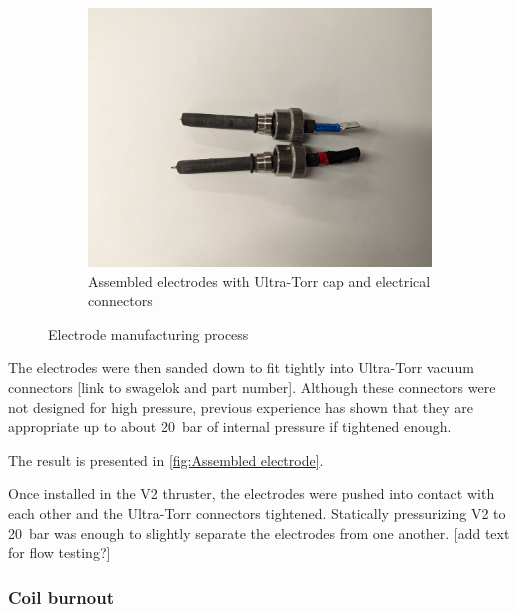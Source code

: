 \begin{figure}[!ht]
                \hfill
                \begin{subfigure}[t]{0.30\textwidth}
                    \centering
                    \includegraphics[width=\textwidth]{assets/3 design/V2 electrodes.jpg}
                    \caption{Assembled electrodes with Ultra-Torr cap and electrical connectors}
                    \label{fig:Assembled electrode}
                \end{subfigure}

                \caption{Electrode manufacturing process}
            \end{figure}

            The electrodes were then sanded down to fit tightly into Ultra-Torr vacuum connectors [link to swagelok and part number]. Although these connectors were not designed for high pressure, previous experience has shown that they are appropriate up to about \qty{20}{bar} of internal pressure if tightened enough.

            The result is presented in \autoref{fig:Assembled electrode}.

            Once installed in the V2 thruster, the electrodes were pushed into contact with each other and the Ultra-Torr connectors tightened. Statically pressurizing V2 to \qty{20}{bar} was enough to slightly separate the electrodes from one another. [add text for flow testing?]

            \subsubsection{Coil burnout}

